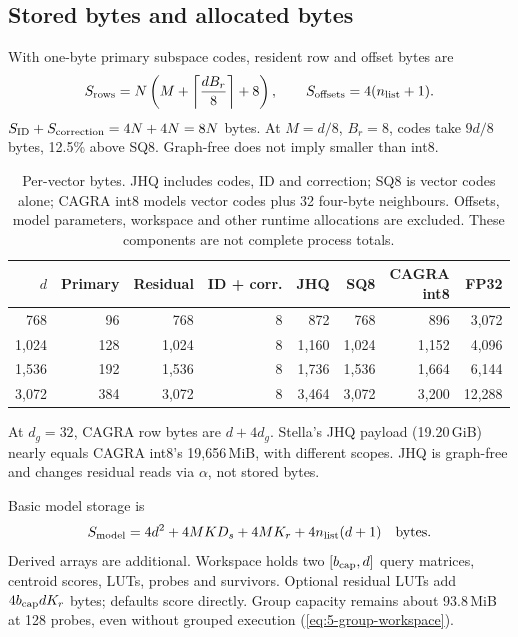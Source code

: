 \subsection{Stored bytes and allocated bytes}

With one-byte primary subspace codes, resident row and offset bytes are
\begin{equation}
 S_{\rm rows}=N\left(M+\left\lceil\frac{dB_r}{8}\right\rceil+8\right),
 \qquad S_{\rm offsets}=4(n_{\rm list}+1).
 \label{eq:4-row-storage}
\end{equation}
$S_{\rm ID}+S_{\rm correction}=4N+4N=8N$ bytes. At $M=d/8$, $B_r=8$, codes take $9d/8$ bytes, 12.5\% above SQ8. Graph-free does not imply smaller than int8.

\begin{table}[tbp]
\centering
\caption[Per-vector storage model]{Per-vector bytes. JHQ includes codes, ID and correction; SQ8 is
vector codes alone; CAGRA int8 models vector codes plus 32 four-byte
neighbours. Offsets, model parameters, workspace and other runtime
allocations are excluded. These components are not complete process totals.}
\label{tab:4-bytes}
\footnotesize\setlength{\tabcolsep}{4pt}
\begin{tabular}{@{}rrrrrrrr@{}}
\toprule
$d$ & Primary & Residual & ID + corr. & JHQ & SQ8 & \shortstack{CAGRA\\int8} & FP32 \\
\midrule
768 & 96 & 768 & 8 & 872 & 768 & 896 & 3,072 \\
1,024 & 128 & 1,024 & 8 & 1,160 & 1,024 & 1,152 & 4,096 \\
1,536 & 192 & 1,536 & 8 & 1,736 & 1,536 & 1,664 & 6,144 \\
3,072 & 384 & 3,072 & 8 & 3,464 & 3,072 & 3,200 & 12,288 \\
\bottomrule
\end{tabular}
\end{table}

At $d_g=32$, CAGRA row bytes are $d+4d_g$. Stella's JHQ payload (19.20\,GiB) nearly equals CAGRA int8's 19,656\,MiB, with different scopes. JHQ is graph-free and changes residual reads via $\alpha$, not stored bytes.

Basic model storage is
\[
 S_{\rm model}
 =4d^2+4MKD_s+4MK_r+4n_{\rm list}(d+1)
 \quad\text{bytes}.
\]
Derived arrays are additional. Workspace holds two $[b_{\rm cap},d]$ query matrices, centroid scores, LUTs, probes and survivors. Optional residual LUTs add $4b_{\rm cap}dK_r$ bytes; defaults score directly. Group capacity remains about 93.8\,MiB at 128 probes, even without grouped execution (\cref{eq:5-group-workspace}).

